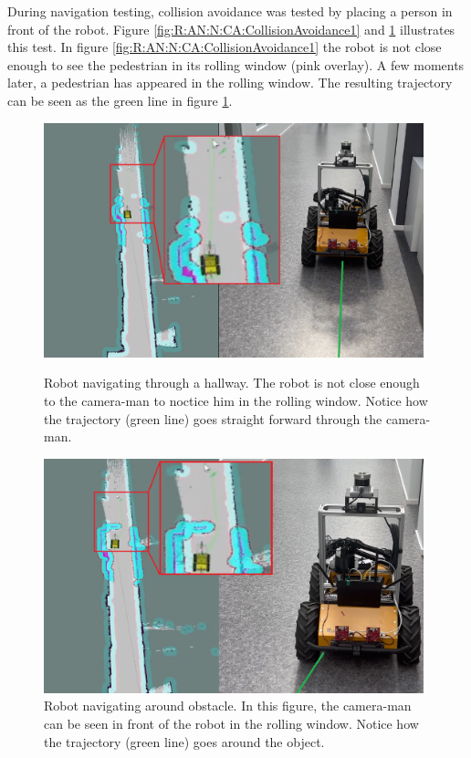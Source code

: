 During navigation testing, collision avoidance was tested by placing a person in front of the robot. Figure \ref{fig:R:AN:N:CA:CollisionAvoidance1} and \ref{fig:R:AN:N:CA:collisionAvoidance2} illustrates this test. In figure \ref{fig:R:AN:N:CA:CollisionAvoidance1} the robot is not close enough to see the pedestrian in its rolling window (pink overlay). A few moments later, a pedestrian has appeared in the rolling window. The resulting trajectory can be seen as the green line in figure \ref{fig:R:AN:N:CA:collisionAvoidance2}.

\begin{figure}[htp!]
  \centering
  \begin{minipage}[b]{0.49\textwidth}
  \centering
    \includegraphics[width = 0.98\textwidth]{Figures/figuiaCollisionAvoidMerged1.png}
    \caption{Robot navigating through a hallway. The robot is not close enough to the camera-man to noctice him in the rolling window. Notice how the trajectory (green line) goes straight forward through the camera-man.}
    \label{fig:R:AN:N:CA:CollisionAvoidance1}
  \end{minipage}
  \hfill
  \begin{minipage}[b]{0.49\textwidth}
    \centering
    \includegraphics[width = 0.98\textwidth]{Figures/figuiaCollisionAvoidMerged2.png}
    \caption{Robot navigating around obstacle. In this figure, the camera-man can be seen in front of the robot in the rolling window. Notice how the trajectory (green line) goes around the object.}
    \label{fig:R:AN:N:CA:collisionAvoidance2}
  \end{minipage}
\end{figure}

